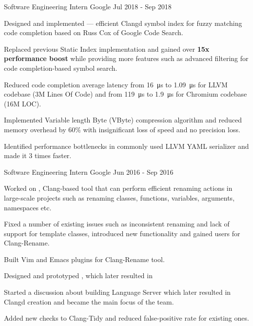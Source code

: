 \begin{cventries}
  \cventry
    {Software Engineering Intern}
    {Google}
    {}
    {Jul 2018 - Sep 2018}
    {
      \begin{cvitems}
        \item Designed and implemented
          --- efficient Clangd symbol index for fuzzy matching code completion
          based on Russ Cox
           of Google Code
          Search.
        \item Replaced previous Static Index implementation and gained over
          \textbf{15x performance boost} while providing more features such as
          advanced filtering for code completion-based symbol search.
        \item Reduced code completion average latency from \SI{16}{\us} to
          \SI{1.09}{\us} for LLVM codebase (3M Lines Of Code) and from
          \SI{119}{\us} to \SI{1.9}{\us} for Chromium codebase (16M LOC).
        \item Implemented Variable length Byte (VByte) compression algorithm
          and reduced memory overhead by 60\% with insignificant loss of
          speed and no precision loss.
        \item Identified performance bottlenecks in commonly used LLVM YAML
          serializer and made it 3 times faster.
      \end{cvitems}
    }

  \cventry
    {Software Engineering Intern}
    {Google}
    {}
    {Jun 2016 - Sep 2016}
    {
      \begin{cvitems}
        \item Worked on
        ,
          Clang-based tool that can perform efficient renaming actions in
          large-scale projects such as renaming classes, functions,
          variables, arguments, namespaces etc.
        \item Fixed a number of existing issues such as inconsistent renaming
          and lack of support for template classes, introduced new
          functionality and gained users for Clang-Rename.
        \item Built Vim and Emacs plugins for Clang-Rename tool.
        \item Designed and prototyped
          ,
          which later resulted in
        \item Started a discussion about building Language Server which later
          resulted in Clangd creation and became the main focus of the team.
        \item Added new checks to Clang-Tidy and reduced false-positive rate
        for existing ones.
      \end{cvitems}
    }


\end{cventries}
